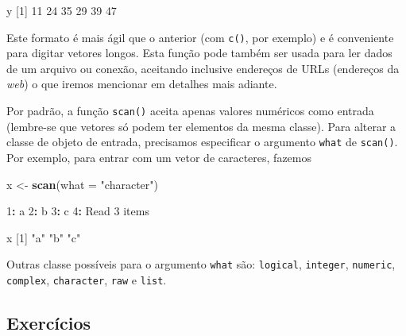 \documentclass[10pt,a4paper]{book}
\newenvironment{Shaded}{\begin{snugshade}}{\end{snugshade}}
\newcommand{\KeywordTok}[1]{\textcolor[rgb]{0.13,0.29,0.53}{\textbf{#1}}}
\newcommand{\DataTypeTok}[1]{\textcolor[rgb]{0.13,0.29,0.53}{#1}}
\newcommand{\DecValTok}[1]{\textcolor[rgb]{0.00,0.00,0.81}{#1}}
\newcommand{\StringTok}[1]{\textcolor[rgb]{0.31,0.60,0.02}{#1}}
\newcommand{\OperatorTok}[1]{\textcolor[rgb]{0.81,0.36,0.00}{\textbf{#1}}}
\newcommand{\NormalTok}[1]{#1}
\begin{document}
\begin{Shaded}
\begin{Highlighting}[]
\NormalTok{y}
\NormalTok{[}\DecValTok{1}\NormalTok{] }\DecValTok{11} \DecValTok{24} \DecValTok{35} \DecValTok{29} \DecValTok{39} \DecValTok{47}
\end{Highlighting}
\end{Shaded}

Este formato é mais ágil que o anterior (com \texttt{c()}, por exemplo)
e é conveniente para digitar vetores longos. Esta função pode também ser
usada para ler dados de um arquivo ou conexão, aceitando inclusive
endereços de URLs (endereços da \emph{web}) o que iremos mencionar em
detalhes mais adiante.

Por padrão, a função \texttt{scan()} aceita apenas valores numéricos
como entrada (lembre-se que vetores só podem ter elementos da mesma
classe). Para alterar a classe de objeto de entrada, precisamos
especificar o argumento \texttt{what} de \texttt{scan()}. Por exemplo,
para entrar com um vetor de caracteres, fazemos

\begin{Shaded}
\begin{Highlighting}[]
\NormalTok{x <-}\StringTok{ }\KeywordTok{scan}\NormalTok{(}\DataTypeTok{what =} \StringTok{"character"}\NormalTok{)}

\DecValTok{1}\OperatorTok{:}\StringTok{ }\NormalTok{a}
\DecValTok{2}\OperatorTok{:}\StringTok{ }\NormalTok{b}
\DecValTok{3}\OperatorTok{:}\StringTok{ }\NormalTok{c}
\DecValTok{4}\OperatorTok{:}
\NormalTok{Read }\DecValTok{3}\NormalTok{ items}
\end{Highlighting}
\end{Shaded}

\begin{Shaded}
\begin{Highlighting}[]
\NormalTok{x}
\NormalTok{[}\DecValTok{1}\NormalTok{] }\StringTok{"a"} \StringTok{"b"} \StringTok{"c"}
\end{Highlighting}
\end{Shaded}

Outras classe possíveis para o argumento \texttt{what} são:
\texttt{logical}, \texttt{integer}, \texttt{numeric}, \texttt{complex},
\texttt{character}, \texttt{raw} e \texttt{list}.

\subsection*{Exercícios}\label{exercuxedcios-9}
\end{document}
